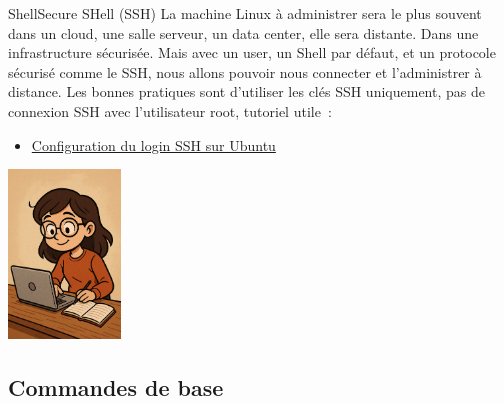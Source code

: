 \documentclass{beamer}
\begin{document}
    \begin{frame}{Shell}{Secure SHell (SSH)}
        La machine Linux à administrer sera le plus souvent dans un cloud, une salle serveur, un data center, elle sera distante.
        Dans une infrastructure sécurisée.
        \bigbreak
        Mais avec un user, un Shell par défaut, et un protocole sécurisé comme le SSH, nous allons pouvoir nous connecter et l'administrer à distance.
        \bigbreak
        Les bonnes pratiques sont d'utiliser les clés SSH uniquement, pas de connexion SSH avec l'utilisateur root,
        tutoriel utile~:
        \begin{itemize}
            \item \href{https://phoenixnap.com/kb/generate-setup-ssh-key-ubuntu}{Configuration du login SSH sur Ubuntu}
        \end{itemize}
        \bigbreak
        \centering
        \includegraphics[width=3cm]{image/student-in-front-of-desktop}
    \end{frame}

    \subsection{Commandes de base}\label{subsec:commandes-de-base}
\end{document}
